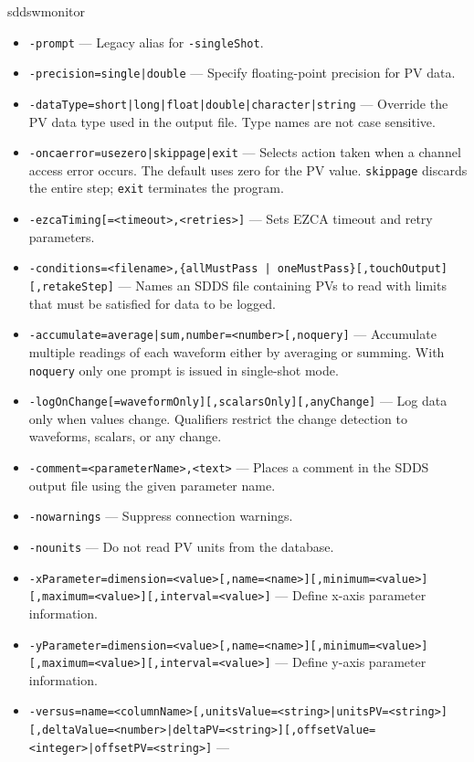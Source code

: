 \begin{sddsprog}{sddswmonitor}
\begin{itemize}
          output. Typing ``q'' or ``Q'' terminates the monitoring.
  \item {\tt -prompt} --- Legacy alias for \verb+-singleShot+.
  \item {\tt -precision={single|double}} --- Specify floating-point
          precision for PV data.
  \item {\tt -dataType={short|long|float|double|character|string}} ---
          Override the PV data type used in the output file. Type names
          are not case sensitive.
  \item {\tt -oncaerror={usezero|skippage|exit}} --- Selects action taken
          when a channel access error occurs. The default uses zero for the PV
          value. \verb+skippage+ discards the entire step; \verb+exit+ terminates
          the program.
  \item {\tt -ezcaTiming[=<timeout>,<retries>]} --- Sets EZCA timeout and
          retry parameters.
  \item {\verb+-conditions=<filename>,{allMustPass | oneMustPass}[,touchOutput][,retakeStep]+} ---
          Names an SDDS file containing PVs to read with limits that must be
          satisfied for data to be logged.
  \item {\tt -accumulate={average|sum},number=<number>[,noquery]} ---
          Accumulate multiple readings of each waveform either by averaging or
          summing. With \verb+noquery+ only one prompt is issued in single-shot
          mode.
  \item {\tt -logOnChange[=waveformOnly][,scalarsOnly][,anyChange]} --- Log
          data only when values change. Qualifiers restrict the change detection
          to waveforms, scalars, or any change.
  \item {\verb+-comment=<parameterName>,<text>+} --- Places a comment in the
          SDDS output file using the given parameter name.
  \item {\tt -nowarnings} --- Suppress connection warnings.
  \item {\tt -nounits} --- Do not read PV units from the database.
  \item {\tt -xParameter=dimension=<value>[,name=<name>][,minimum=<value>][,maximum=<value>][,interval=<value>]} ---
          Define x-axis parameter information.
  \item {\tt -yParameter=dimension=<value>[,name=<name>][,minimum=<value>][,maximum=<value>][,interval=<value>]} ---
          Define y-axis parameter information.
  \item {\tt -versus=name=<columnName>[,unitsValue=<string>|unitsPV=<string>][,deltaValue=<number>|deltaPV=<string>][,offsetValue=<integer>|offsetPV=<string>]} ---

\end{itemize}
\end{sddsprog}
